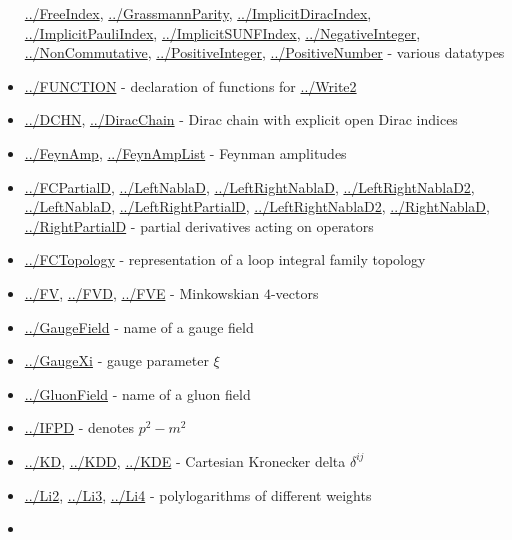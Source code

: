 \documentclass[../FeynCalcManual.tex]{subfiles}
\begin{document}
\begin{itemize}
  \hyperlink{../freeindex}{../FreeIndex},
  \hyperlink{../grassmannparity}{../GrassmannParity},
  \hyperlink{../implicitdiracindex}{../ImplicitDiracIndex},
  \hyperlink{../implicitpauliindex}{../ImplicitPauliIndex},
  \hyperlink{../implicitsunfindex}{../ImplicitSUNFIndex},
  \hyperlink{../negativeinteger}{../NegativeInteger},
  \hyperlink{../noncommutative}{../NonCommutative},
  \hyperlink{../positiveinteger}{../PositiveInteger},
  \hyperlink{../positivenumber}{../PositiveNumber} - various datatypes
\item
  \hyperlink{../function}{../FUNCTION} - declaration of functions for
  \hyperlink{../write2}{../Write2}
\item
  \hyperlink{../dchn}{../DCHN}, \hyperlink{../diracchain}{../DiracChain}
  - Dirac chain with explicit open Dirac indices
\item
  \hyperlink{../feynamp}{../FeynAmp},
  \hyperlink{../feynamplist}{../FeynAmpList} - Feynman amplitudes
\item
  \hyperlink{../fcpartiald}{../FCPartialD},
  \hyperlink{../leftnablad}{../LeftNablaD},
  \hyperlink{../leftrightnablad}{../LeftRightNablaD},
  \hyperlink{../leftrightnablad2}{../LeftRightNablaD2},
  \hyperlink{../leftnablad}{../LeftNablaD},
  \hyperlink{../leftrightpartiald}{../LeftRightPartialD},
  \hyperlink{../leftrightnablad2}{../LeftRightNablaD2},
  \hyperlink{../rightnablad}{../RightNablaD},
  \hyperlink{../rightpartiald}{../RightPartialD} - partial derivatives
  acting on operators
\item
  \hyperlink{../fctopology}{../FCTopology} - representation of a loop
  integral family topology
\item
  \hyperlink{../fv}{../FV}, \hyperlink{../fvd}{../FVD},
  \hyperlink{../fve}{../FVE} - Minkowskian \(4\)-vectors
\item
  \hyperlink{../gaugefield}{../GaugeField} - name of a gauge field
\item
  \hyperlink{../gaugexi}{../GaugeXi} - gauge parameter \(\xi\)
\item
  \hyperlink{../gluonfield}{../GluonField} - name of a gluon field
\item
  \hyperlink{../ifpd}{../IFPD} - denotes \(p^2 - m^2\)
\item
  \hyperlink{../kd}{../KD}, \hyperlink{../kdd}{../KDD},
  \hyperlink{../kde}{../KDE} - Cartesian Kronecker delta \(\delta^{ij}\)
\item
  \hyperlink{../li2}{../Li2}, \hyperlink{../li3}{../Li3},
  \hyperlink{../li4}{../Li4} - polylogarithms of different weights
\item

\end{itemize}
\end{document}

